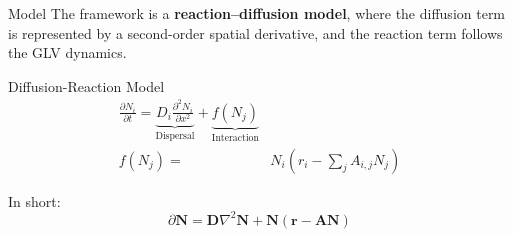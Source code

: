 \documentclass[aspectratio=169]{beamer}
\begin{document}
    \begin{frame}{Model}
        The framework is a \textbf{reaction--diffusion model}, where the diffusion term is represented by a second-order spatial derivative, and the reaction term follows the GLV dynamics.
        \begin{block}{Diffusion-Reaction Model}
            \begin{equation}
                \begin{aligned}
                    \frac{\partial N_i}{\partial t}
                    = \underbrace{ D_{i}\frac{\partial^2 N_i}{\partial x^2}}_{\text{Dispersal}} + 
                    \underbrace{f(N_j) }_{\text{Interaction}}&\\
                    f(N_j) = & N_i \left( r_i - \sum_{j} A_{i,j} N_j \right)
                \end{aligned}
            \end{equation}
        \end{block}
        
        In short:
        \begin{equation*}
            \partial \mathbf{N} = \mathbf{D} \nabla^2 \mathbf{N} + \mathbf{N} (\mathbf{r} - \mathbf{A}\mathbf{N})
        \end{equation*}
    \end{frame}

\end{document}

